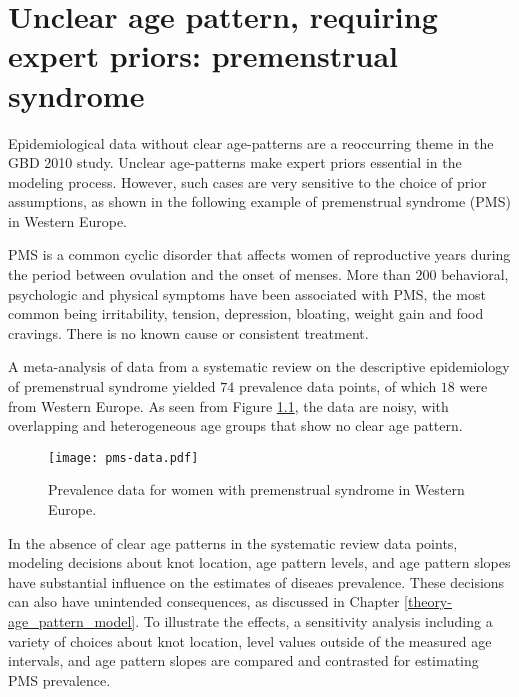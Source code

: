 \chapter{Unclear age pattern, requiring expert priors: premenstrual syndrome}
\label{applications-priors_knots_select}

Epidemiological data without clear age-patterns are a reoccurring
theme in the GBD 2010 study.  Unclear age-patterns make expert priors
essential in the modeling process.  However, such cases are very
sensitive to the choice of prior assumptions, as shown in the
following example of premenstrual syndrome (PMS) in Western Europe.

PMS is a common cyclic disorder that affects women of reproductive
years during the period between ovulation and the onset of menses.
More than $200$ behavioral, psychologic and physical symptoms have been
associated with PMS, the most common being irritability, tension,
depression, bloating, weight gain and food cravings.  There is no
known cause or consistent
treatment. \cite{dickerson_premenstrual_2003, singh_incidence_1998,
  goodale_alleviation_1990}

A meta-analysis of data from a systematic review on the descriptive
epidemiology of premenstrual syndrome yielded $74$ prevalence
data points, of which $18$ were from Western Europe.  As seen from Figure
\ref{fig:app-pms_data}, the data are noisy, with overlapping and
heterogeneous age groups that show no clear age pattern.

    \begin{figure}[h]
        \begin{center}
            \texttt{[image: pms-data.pdf]}
            \caption{Prevalence data for women with premenstrual
              syndrome in Western Europe.}
        \end{center}
        \label{fig:app-pms_data}
    \end{figure}

In the absence of clear age patterns in the systematic review data
points, modeling decisions about knot location, age pattern levels,
and age pattern slopes have substantial influence on the estimates of
diseaes prevalence.  These decisions can also have unintended
consequences, as discussed in Chapter \ref{theory-age_pattern_model}.
To illustrate the effects, a sensitivity analysis including a variety
of choices about knot location,
level values outside of the measured age intervals, and age pattern
slopes are compared and contrasted for estimating PMS prevalence.

